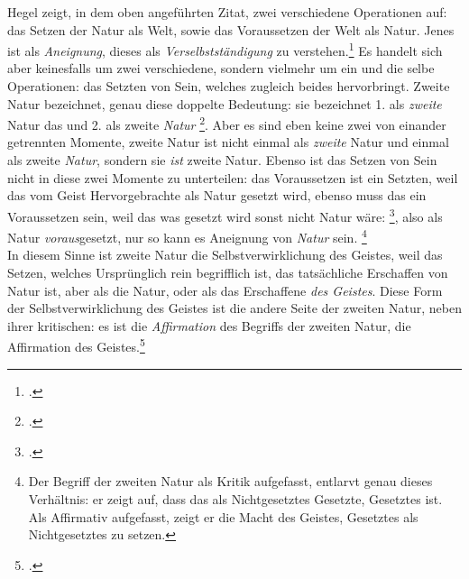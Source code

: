 \documentclass[12pt, a4paper, openany]{report}
\begin{document}
Hegel zeigt, in dem oben angeführten Zitat, zwei verschiedene Operationen auf: 
das Setzen der Natur als Welt, sowie das Voraussetzen der Welt als Natur.
Jenes ist als \emph{Aneignung}, dieses als \emph{Verselbstständigung} zu verstehen.\footcite[Vgl][141]{menke_autonomie_2018}
Es handelt sich aber keinesfalls um zwei verschiedene, sondern vielmehr um ein und die selbe Operationen: das Setzten von Sein, welches zugleich beides hervorbringt.
Zweite Natur bezeichnet, genau diese doppelte Bedeutung: 
sie bezeichnet 1. als \emph{zweite} Natur das  und 2. als zweite \emph{Natur} \footcite[][142]{menke_autonomie_2018}.
Aber es sind eben keine zwei von einander getrennten Momente, zweite Natur ist nicht einmal als \emph{zweite} Natur und einmal als zweite \emph{Natur}, sondern sie \emph{ist} zweite Natur.
Ebenso ist das Setzen von Sein nicht in diese zwei Momente zu unterteilen:
das Voraussetzen ist ein Setzten, weil das vom Geist Hervorgebrachte als Natur gesetzt wird,
ebenso muss das  ein Voraussetzen sein, weil das was gesetzt wird sonst nicht Natur wäre: 
\footcite[][142]{menke_autonomie_2018}, also als Natur \emph{voraus}gesetzt, nur so kann es Aneignung von \emph{Natur} sein.
\footnote{
    Der Begriff der zweiten Natur als Kritik aufgefasst, entlarvt genau dieses Verhältnis: er zeigt auf, dass das als Nichtgesetztes Gesetzte, Gesetztes ist.
    Als Affirmativ aufgefasst, zeigt er die Macht des Geistes, Gesetztes als Nichtgesetztes zu setzen.
}\\
In diesem Sinne ist zweite Natur die Selbstverwirklichung des Geistes, weil das Setzen, welches Ursprünglich rein begrifflich ist, das tatsächliche Erschaffen von Natur ist, aber als die Natur, oder als das Erschaffene \emph{des Geistes}.
Diese Form der Selbstverwirklichung des Geistes ist die andere Seite der zweiten Natur, neben ihrer kritischen: es ist die \emph{Affirmation} des Begriffs der zweiten Natur, die Affirmation des Geistes.\footcite[Vgl.][143]{menke_autonomie_2018}\\
\end{document}
